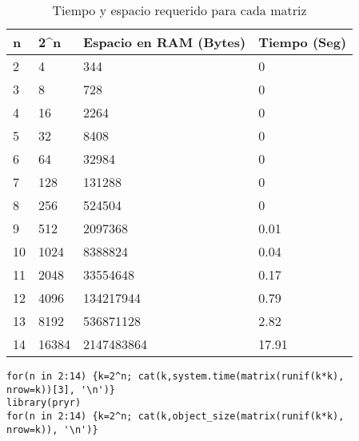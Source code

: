\documentclass{article}
\begin{document}
\begin{table}[h]
\centering
\begin{tabular}{|l|l|l|l|}
\hline
n  & 2\textasciicircum{}n & Espacio en RAM (Bytes) & Tiempo (Seg) \\ \hline
2  & 4                    & 344                    & 0            \\ \hline
3  & 8                    & 728                    & 0            \\ \hline
4  & 16                   & 2264                   & 0            \\ \hline
5  & 32                   & 8408                   & 0            \\ \hline
6  & 64                   & 32984                  & 0            \\ \hline
7  & 128                  & 131288                 & 0            \\ \hline
8  & 256                  & 524504                 & 0            \\ \hline
9  & 512                  & 2097368                & 0.01         \\ \hline
10 & 1024                 & 8388824                & 0.04         \\ \hline
11 & 2048                 & 33554648               & 0.17         \\ \hline
12 & 4096                 & 134217944              & 0.79         \\ \hline
13 & 8192                 & 536871128              & 2.82         \\ \hline
14 & 16384                & 2147483864             & 17.91        \\ \hline
\end{tabular}
\caption{Tiempo y espacio requerido para cada matriz}
\label{tabla 1}
\end{table}

\lstset{language=Python}
\lstset{frame=lines}
\lstset{basicstyle=\footnotesize}
\begin{lstlisting}
for(n in 2:14) {k=2^n; cat(k,system.time(matrix(runif(k*k),
nrow=k))[3], '\n')}
library(pryr)
for(n in 2:14) {k=2^n; cat(k,object_size(matrix(runif(k*k),
nrow=k)), '\n')}
\end{lstlisting}
\end{document}
